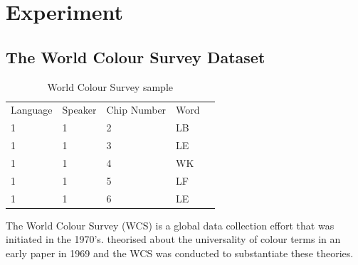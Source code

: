 \documentclass[11pt]{article}
\begin{document}










\section{Experiment}
\label{sec:experiment}

\subsection{The World Colour Survey Dataset}
\label{ssec:color_dataset}

\begin{table}[h]
\begin{tabular}{lllll}
Language & Speaker & Chip Number & Word &  \\
1        & 1       & 2    & LB   &  \\
1        & 1       & 3    & LE   &  \\
1        & 1       & 4    & WK   &  \\
1        & 1       & 5    & LF   &  \\
1        & 1       & 6    & LE   & 
\end{tabular}
\caption{World Colour Survey sample}
\label{table:raw_data}
\end{table}

The World Colour Survey (WCS) \cite{berlin1991basic} is a global data collection effort that was initiated in the 1970's.
\citet{merrifield1971} theorised about the universality of colour terms in an early paper in 1969 and the WCS was conducted to substantiate these theories.
\end{document}
